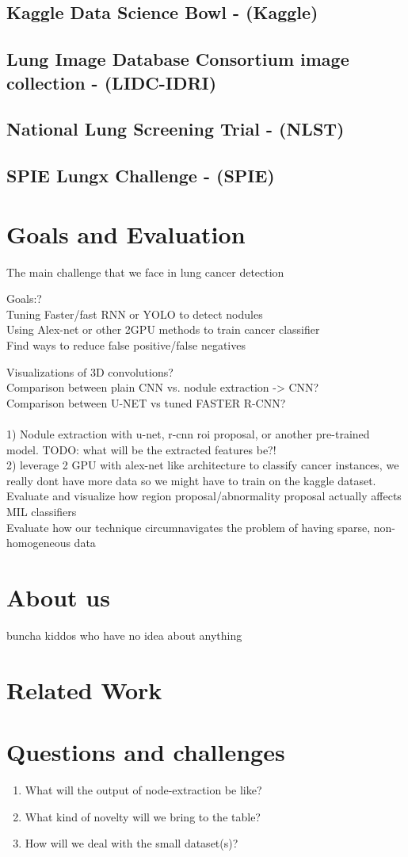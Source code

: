 \documentclass[twocolumn,10pt]{article}
\newcommand{\red}[1]{{\color{red}#1}}
\newcommand{\temp}[1]{{\red{#1}\\}}
\begin{document}
\subsection{Kaggle Data Science Bowl - (Kaggle)}
\subsection{Lung Image Database Consortium image collection - (LIDC-IDRI)}
\subsection{National Lung Screening Trial - (NLST)}
\subsection{SPIE Lungx Challenge - (SPIE)}

\section{Goals and Evaluation}

The main challenge that we face in lung cancer detection 

\temp{Goals:?}
\temp{Tuning Faster/fast RNN or YOLO to detect nodules}
\temp{Using Alex-net or other 2GPU methods to train cancer classifier}
\temp{Find ways to reduce false positive/false negatives}

\temp{Visualizations of 3D convolutions?}
\temp{Comparison between plain CNN vs. nodule extraction -> CNN? }
\temp{Comparison between U-NET vs tuned FASTER R-CNN?}
\temp{}
\temp{
	1) Nodule extraction with u-net, r-cnn roi proposal, or another pre-trained
	model. TODO: what will be the extracted features be?! \\
	2) leverage 2 GPU with alex-net like architecture to classify cancer
	instances, we really dont have more data so we might have to train on the
	kaggle dataset.
}
\temp{Evaluate and visualize how region proposal/abnormality proposal actually
affects MIL classifiers}
\temp{Evaluate how our technique circumnavigates the problem of having sparse,
non-homogeneous data}

\section{About us}
\temp{buncha kiddos who have no idea about anything}

\section{Related Work}

\section{Questions and challenges}
\begin{enumerate}
	\item What will the output of node-extraction be like?
	\item What kind of novelty will we bring to the table?
	\item How will we deal with the small dataset(s)?
\end{enumerate}
\end{document}
